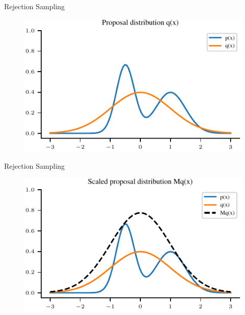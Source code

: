 \documentclass[handout]{beamer}
\begin{document}
    \begin{frame}{Rejection Sampling}
        \begin{figure}
            \centering
            \includegraphics{notebooks/figures/sampling/rejection-sampling--1.0-True-False-False-False-False-False-False-False.pdf}
        \end{figure}
    \end{frame}

    \begin{frame}{Rejection Sampling}
        \begin{figure}
            \centering
            \includegraphics{notebooks/figures/sampling/rejection-sampling--1.0-True-True-False-False-False-False-False-False.pdf}
        \end{figure}
    \end{frame}
\end{document}
